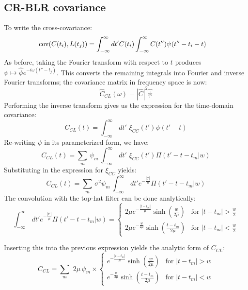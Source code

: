 \documentclass[11pt,a4paper]{article}
\begin{document}
\subsection{CR-BLR covariance}
To write the cross-covariance:
\begin{align}
{\rm cov}(C(t_i),L(t_j))& = \int_{-\infty}^{\infty}dt'C(t_i)\int_{-\infty}^{\infty}C(t'')\psi(t''-t_i-t)
\end{align}
As before, taking the Fourier transform with respect to $t$ produces
$\psi\mapsto \hat{\psi}e^{-i\omega(t''-t_j)}$. This converts the
remaining integrals into Fourier and inverse Fourier transforms; the
covariance matrix in frequency space is now:
\begin{equation}
  \hat{C}_{CL}(\omega) = |\hat{C}|^2\hat{\psi}
\end{equation}
Performing the inverse transform gives us the expression for the
time-domain covariance:
\begin{equation}
C_{CL}(t) = \int_{-\infty}^{\infty}\,dt'\,\, \xi_{CC}(t')\psi(t'-t)
\end{equation}
Re-writing $\psi$ in its parameterized form, we have:
\begin{equation}
C_{CL}(t) = \sum\limits_{m}\, \psi_m\,\int_{-\infty}^{\infty}\,dt'\,\,\xi_{CC}(t')\Pi(t'-t-t_m|w)
\end{equation}
Substituting in the expression for $\xi_{CC}$ yields:
\begin{equation}
C_{CL}(t) = \sum\limits_{m}\, \sigma^2\psi_m\,\int_{-\infty}^{\infty}\,dt'e^{-\frac{|t'|}{\mu}}\Pi(t'-t-t_m|w)
\end{equation}
The convolution with the top-hat filter can be done analytically:
\begin{equation}
  \int_{-\infty}^{\infty}\,dt'e^{-\frac{|t'|}{\mu}}\Pi(t'-t-t_m|w)
  = \begin{cases}
    2\mu e^{-\frac{|t-t_m|}{\mu}}\sinh(\frac{w}{2\mu}) & \text{for
      $|t-t_m|>\frac{w}{2}$} \\
    2\mu e^{-\frac{w}{2\mu}}\sinh(\frac{t-t_m}{2\mu}) & \text{for $|t-t_m|<\frac{w}{2}$}
  \end{cases}
\end{equation}

Inserting this into the previous expression yields the analytic form
of $C_{CL}$:
\begin{equation}
  C_{CL}=\sum\limits_{m}\,\,2\mu\,\psi_m\times
  \begin{cases}
    e^{-\frac{|t-t_m|}{\mu}}\sinh\left(\frac{w}{2\mu}\right) &
    \text{for
      $|t-t_m|>w$} \\
    e^{-\frac{w}{2\mu}}\sinh\left(\frac{t-t_m}{2\mu}\right) &
    \text{for $|t-t_m|<w$}
  \end{cases}
\end{equation}
\end{document}
